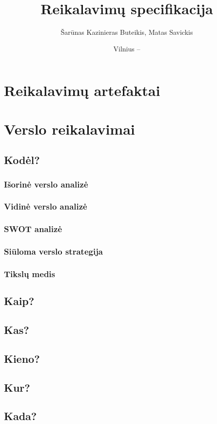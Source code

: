 \documentclass{VUMIFPSkursinis}
\title{Reikalavimų specifikacija}
\author{Šarūnas Kazinieras Buteikis, Matas Savickis}
\date{Vilnius – \the\year}
\begin{document}
\maketitle

\tableofcontents

\section{Reikalavimų artefaktai}

\section{Verslo reikalavimai}
	
	\subsection{Kodėl?}

		\subsubsection{Išorinė verslo analizė}

		\subsubsection{Vidinė verslo analizė}

		\subsubsection{SWOT analizė}

		\subsubsection{Siūloma verslo strategija}

		\subsubsection{Tikslų medis}

	\subsection{Kaip?}

	\subsection{Kas?}

	\subsection{Kieno?}

	\subsection{Kur?}

	\subsection{Kada?}
\end{document}
